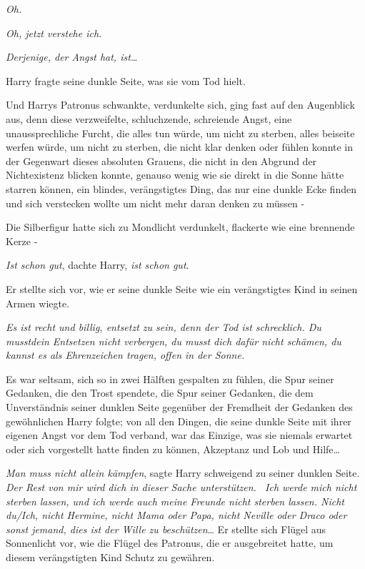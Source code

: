 {\emph{Oh.}

\emph{Oh, jetzt verstehe ich.}

\emph{Derjenige, der Angst hat, ist…}

Harry fragte seine dunkle Seite, was sie vom Tod hielt.

Und Harrys Patronus schwankte, verdunkelte sich, ging fast auf den Augenblick aus, denn diese verzweifelte, schluchzende, schreiende Angst, eine unaussprechliche Furcht, die alles tun würde, um nicht zu sterben, alles beiseite werfen würde, um nicht zu sterben, die nicht klar denken oder fühlen konnte in der Gegenwart dieses absoluten Grauens, die nicht in den Abgrund der Nichtexistenz blicken konnte, genauso wenig wie sie direkt in die Sonne hätte starren können, ein blindes, verängstigtes Ding, das nur eine dunkle Ecke finden und sich verstecken wollte um nicht mehr daran denken zu müssen -

Die Silberfigur hatte sich zu Mondlicht verdunkelt, flackerte wie eine brennende Kerze -

\emph{Ist schon gut}, dachte Harry, \emph{ist schon gut}.

Er stellte sich vor, wie er seine dunkle Seite wie ein verängstigtes Kind in seinen Armen wiegte.

\emph{\emph{Es ist recht und billig, entsetzt zu sein, denn der Tod ist schrecklich.} \emph{Du} \emph{musstdein Entsetzen nicht verbergen,} \emph{du musst dich dafür nicht schämen,} \emph{du kannst} \emph{es als Ehrenzeichen tragen, offen in der Sonne.}}

Es war seltsam, sich so in zwei Hälften gespalten zu fühlen, die Spur seiner Gedanken, die den Trost spendete, die Spur seiner Gedanken, die dem Unverständnis seiner dunklen Seite gegenüber der Fremdheit der Gedanken des gewöhnlichen Harry folgte; von all den Dingen, die seine dunkle Seite mit ihrer eigenen Angst vor dem Tod verband, war das Einzige, was sie niemals erwartet oder sich vorgestellt hatte finden zu können, Akzeptanz und Lob und Hilfe…

\emph{Man muss nicht allein kämpfen}, sagte Harry schweigend zu seiner dunklen Seite. \emph{Der Rest von mir wird dich in dieser Sache unterstützen. ~Ich werde mich nicht sterben lassen, und ich werde auch meine Freunde nicht sterben lassen. Nicht du/Ich, nicht Hermine, nicht Mama oder Papa, nicht Neville oder Draco oder sonst jemand, dies ist der Wille zu beschützen}… Er stellte sich Flügel aus Sonnenlicht vor, wie die Flügel des Patronus, die er ausgebreitet hatte, um diesem verängstigten Kind Schutz zu gewähren.

}
